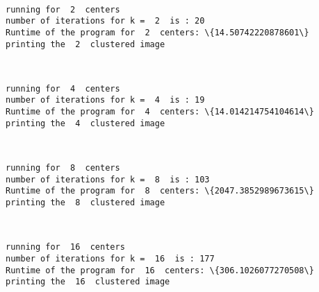 \documentclass[11pt]{article}
\begin{document}
    \begin{center}
    \end{center}
    { \hspace*{\fill} \\}
    
    \begin{Verbatim}[commandchars=\\\{\}]
running for  2  centers
number of iterations for k =  2  is : 20
Runtime of the program for  2  centers: \{14.50742220878601\}
printing the  2  clustered image
    \end{Verbatim}

    \begin{center}
    \end{center}
    { \hspace*{\fill} \\}
    
    \begin{Verbatim}[commandchars=\\\{\}]
running for  4  centers
number of iterations for k =  4  is : 19
Runtime of the program for  4  centers: \{14.014214754104614\}
printing the  4  clustered image
    \end{Verbatim}

    \begin{center}
    \end{center}
    { \hspace*{\fill} \\}
    
    \begin{Verbatim}[commandchars=\\\{\}]
running for  8  centers
number of iterations for k =  8  is : 103
Runtime of the program for  8  centers: \{2047.3852989673615\}
printing the  8  clustered image
    \end{Verbatim}

    \begin{center}
    \end{center}
    { \hspace*{\fill} \\}
    
    \begin{Verbatim}[commandchars=\\\{\}]
running for  16  centers
number of iterations for k =  16  is : 177
Runtime of the program for  16  centers: \{306.1026077270508\}
printing the  16  clustered image
    \end{Verbatim}
\end{document}
